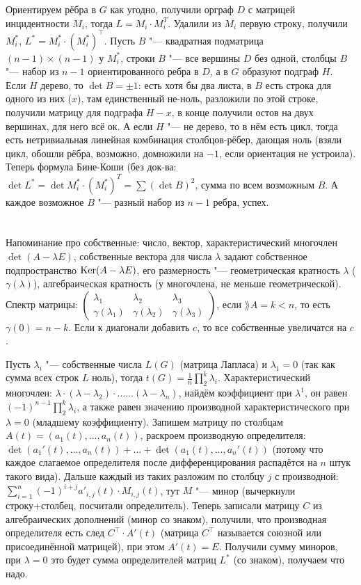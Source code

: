 Ориентируем рёбра в $G$ как угодно, получили орграф $D$ с матрицей инцидентности $M_i$, тогда $L=M_i \cdot M_i^T$.
Удалили из $M_i$ первую строку, получили $M_i^*$, $L^*=M_i^*\cdot (M_i^*)^\top$.
Пусть $B$ "--- квадратная подматрица $(n-1)\times(n-1)$ у $M_i^*$, строки $B$ "--- все вершины $D$ без одной, столбцы $B$ "--- набор из $n-1$
ориентированного ребра в $D$, а в $G$ образуют подграф $H$.
Если $H$ дерево, то $\det B = \pm 1$: есть хотя бы два листа, в $B$ есть строка для одного из них ($x$),
там единственный не-ноль, разложили по этой строке, получили матрицу для подграфа $H-x$, в конце получили остов на двух вершинах,
для него всё ок.
А если $H$ "--- не дерево, то в нём есть цикл, тогда есть нетривиальная линейная комбинация столбцов-рёбер, дающая ноль
(взяли цикл, обошли рёбра, возможно, домножили на $-1$, если ориентация не устроила).
Теперь формула Бине-Коши (без док-ва: $\det L^* = \det M_i^* \cdot (M_i^*)^T = \sum (\det B)^2$, сумма по всем возможным $B$.
А каждое возможное $B$ "--- разный набор из $n-1$ ребра, успех.

\section{} %
Напоминание про собственные: число, вектор, характеристический многочлен $\det(A-\lambda E)$, собственные вектора для числа $\lambda$ задают собственное подпространство $\operatorname{Ker} (A-\lambda E)$,
его размерность "--- геометрическая кратность $\lambda$ ($\gamma(\lambda)$), алгебраическая кратность (у многочлена, не меньше геометрической).
Спектр матрицы: $\begin{pmatrix}\lambda_1 & \lambda_2 & \lambda_3 \\ \gamma(\lambda_1) & \gamma(\lambda_2) & \gamma(\lambda_3) \end{pmatrix}$,
если $\rang A = k < n$, то есть $\gamma(0)=n-k$.
Если к диагонали добавить $c$, то все собственные увеличатся на $c$.

Пусть $\lambda_i$ "--- собственные числа $L(G)$ (матрица Лапласа) и $\lambda_1=0$ (так как сумма всех строк $L$ ноль), тогда
$t(G)=\frac{1}{n} \prod_2^k \lambda_i$.
Характеристический многочлен: $\lambda \cdot (\lambda-\lambda_2) \cdot \dots \dots (\lambda-\lambda_n)$, найдём коэффициент
при $\lambda^1$, он равен $(-1)^{n-1} \prod_2^k \lambda_i$, а также равен значению производной характеристического при $\lambda=0$ (младшему коэффициенту).
Запишем матрицу по столбцам $A(t)=(a_1(t), \dots, a_n(t))$, раскроем производную определителя: $\det(a_1'(t), \dots, a_n(t)) + \dots + \det(a_1(t), \dots, a_n'(t))$
(потому что каждое слагаемое определителя после дифференцирования распадётся на $n$ штук такого вида).
Дальше каждый из таких разложим по столбцу $j$ с производной: $\sum_{i=1}^n (-1)^{i+j}a'_{i,j}(t)\cdot M_{i,j}(t)$, тут $M$ "--- минор (вычеркнули строку+столбец, посчитали определитель).
Теперь записали матрицу $C$ из алгебраических дополнений (минор со знаком), получили, что производная определителя есть след $C^\top \cdot A'(t)$ (матрица $C^\top$ называется союзной
или присоединённой матрицей), при этом $A'(t)=E$.
Получили сумму миноров, при $\lambda=0$ это будет сумма определителей матриц $L^*$ (со знаком), получаем что надо.

